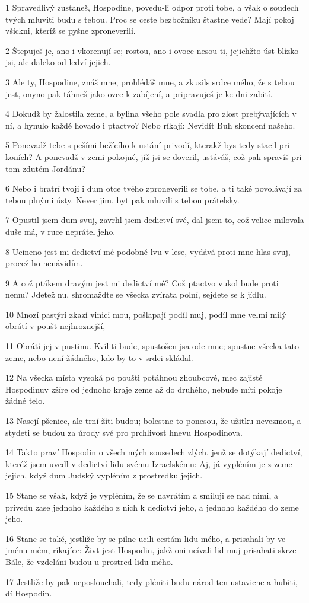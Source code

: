 \par 1 Spravedlivý zustaneš, Hospodine, povedu-li odpor proti tobe, a však o soudech tvých mluviti budu s tebou. Proc se ceste bezbožníku štastne vede? Mají pokoj všickni, kteríž se pyšne zproneverili.
\par 2 Štepuješ je, ano i vkorenují se; rostou, ano i ovoce nesou ti, jejichžto úst blízko jsi, ale daleko od ledví jejich.
\par 3 Ale ty, Hospodine, znáš mne, prohlédáš mne, a zkusils srdce mého, že s tebou jest, onyno pak táhneš jako ovce k zabíjení, a pripravuješ je ke dni zabití.
\par 4 Dokudž by žalostila zeme, a bylina všeho pole svadla pro zlost prebývajících v ní, a hynulo každé hovado i ptactvo? Nebo ríkají: Nevidít Buh skoncení našeho.
\par 5 Ponevadž tebe s pešími bežícího k ustání privodí, kterakž bys tedy stacil pri koních? A ponevadž v zemi pokojné, jíž jsi se doveril, ustáváš, což pak spravíš pri tom zdutém Jordánu?
\par 6 Nebo i bratrí tvoji i dum otce tvého zproneverili se tobe, a ti také povolávají za tebou plnými ústy. Never jim, byt pak mluvili s tebou prátelsky.
\par 7 Opustil jsem dum svuj, zavrhl jsem dedictví své, dal jsem to, což velice milovala duše má, v ruce neprátel jeho.
\par 8 Ucineno jest mi dedictví mé podobné lvu v lese, vydává proti mne hlas svuj, procež ho nenávidím.
\par 9 A což ptákem dravým jest mi dedictví mé? Což ptactvo vukol bude proti nemu? Jdetež nu, shromaždte se všecka zvírata polní, sejdete se k jídlu.
\par 10 Mnozí pastýri zkazí vinici mou, pošlapají podíl muj, podíl mne velmi milý obrátí v poušt nejhroznejší,
\par 11 Obrátí jej v pustinu. Kvíliti bude, spustošen jsa ode mne; spustne všecka tato zeme, nebo není žádného, kdo by to v srdci skládal.
\par 12 Na všecka místa vysoká po poušti potáhnou zhoubcové, mec zajisté Hospodinuv zžíre od jednoho kraje zeme až do druhého, nebude míti pokoje žádné telo.
\par 13 Nasejí pšenice, ale trní žíti budou; bolestne to ponesou, že užitku nevezmou, a stydeti se budou za úrody své pro prchlivost hnevu Hospodinova.
\par 14 Takto praví Hospodin o všech mých sousedech zlých, jenž se dotýkají dedictví, kteréž jsem uvedl v dedictví lidu svému Izraelskému: Aj, já vypléním je z zeme jejich, když dum Judský vypléním z prostredku jejich.
\par 15 Stane se však, když je vypléním, že se navrátím a smiluji se nad nimi, a privedu zase jednoho každého z nich k dedictví jeho, a jednoho každého do zeme jeho.
\par 16 Stane se také, jestliže by se pilne ucili cestám lidu mého, a prisahali by ve jménu mém, ríkajíce: Živt jest Hospodin, jakž oni ucívali lid muj prisahati skrze Bále, že vzdeláni budou u prostred lidu mého.
\par 17 Jestliže by pak neposlouchali, tedy pléniti budu národ ten ustavicne a hubiti, dí Hospodin.

